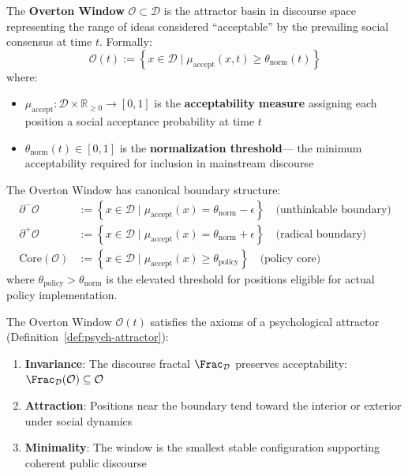 \begin{definition}
\label{def:overton-window}
The \textbf{Overton Window} $\mathcal{O} \subset \mathcal{D}$ is the attractor basin
in discourse space representing the range of ideas considered ``acceptable'' by the
prevailing social consensus at time $t$. Formally:
\[
\boxed{
    \mathcal{O}(t) := \left\{ x \in \mathcal{D} \;\Big|\;
    \mu_{\mathrm{accept}}(x, t) \geq \theta_{\mathrm{norm}}(t) \right\}
}
\]
where:
\begin{itemize}
    \item $\mu_{\mathrm{accept}} : \mathcal{D} \times \mathbb{R}_{\geq 0} \to [0,1]$
          is the \textbf{acceptability measure} assigning each position a social
          acceptance probability at time $t$
    \item $\theta_{\mathrm{norm}}(t) \in [0,1]$ is the \textbf{normalization threshold}---
          the minimum acceptability required for inclusion in mainstream discourse
\end{itemize}
\end{definition}

\begin{definition}
\label{def:window-topology}
The Overton Window has canonical boundary structure:
\begin{align}
    \partial^{-}\mathcal{O} &:= \left\{ x \in \mathcal{D} \;\Big|\;
        \mu_{\mathrm{accept}}(x) = \theta_{\mathrm{norm}} - \epsilon \right\}
        \quad \text{(unthinkable boundary)} \\
    \partial^{+}\mathcal{O} &:= \left\{ x \in \mathcal{D} \;\Big|\;
        \mu_{\mathrm{accept}}(x) = \theta_{\mathrm{norm}} + \epsilon \right\}
        \quad \text{(radical boundary)} \\
    \mathrm{Core}(\mathcal{O}) &:= \left\{ x \in \mathcal{D} \;\Big|\;
        \mu_{\mathrm{accept}}(x) \geq \theta_{\mathrm{policy}} \right\}
        \quad \text{(policy core)}
\end{align}
where $\theta_{\mathrm{policy}} > \theta_{\mathrm{norm}}$ is the elevated threshold
for positions eligible for actual policy implementation.
\end{definition}

\begin{proposition}
\label{prop:overton-attractor}
The Overton Window $\mathcal{O}(t)$ satisfies the axioms of a psychological attractor
(Definition~\ref{def:psych-attractor}):
\begin{enumerate}[label=(\roman*)]
    \item \textbf{Invariance}: The discourse fractal $\Frac_{\mathcal{D}}$ preserves
          acceptability: $\Frac_{\mathcal{D}}(\mathcal{O}) \subseteq \mathcal{O}$
    \item \textbf{Attraction}: Positions near the boundary tend toward the interior
          or exterior under social dynamics
    \item \textbf{Minimality}: The window is the smallest stable configuration supporting
          coherent public discourse
\end{enumerate}
\end{proposition}

